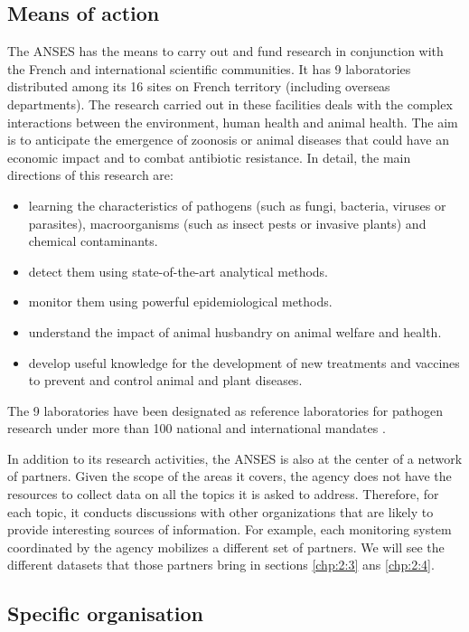 \subsection{Means of action}

The ANSES has the means to carry out and fund research in conjunction with the French and international scientific communities. It has 9 laboratories distributed among its 16 sites on French territory (including overseas departments). The research carried out in these facilities deals with the complex interactions between the environment, human health and animal health. The aim is to anticipate the emergence of zoonosis or animal diseases that could have an economic impact and to combat antibiotic resistance. In detail, the main directions of this research are:
\begin{itemize}
\item learning the characteristics of pathogens (such as fungi, bacteria, viruses or parasites), macroorganisms (such as insect pests or invasive plants) and chemical contaminants. 
\item detect them using state-of-the-art analytical methods.
\item monitor them using powerful epidemiological methods.
\item understand the impact of animal husbandry on animal welfare and health.
\item develop useful knowledge for the development of new treatments and vaccines to prevent and control animal and plant diseases. 
\end{itemize} 
The 9 laboratories have been designated as reference laboratories for pathogen research under more than 100 national and international mandates \cite{ANSESLABS}.

In addition to its research activities, the ANSES is also at the center of a network of partners. Given the scope of the areas it covers, the agency does not have the resources to collect data on all the topics it is asked to address. Therefore, for each topic, it conducts discussions with other organizations that are likely to provide interesting sources of information. For example, each monitoring system coordinated by the agency mobilizes a different set of partners. We will see the different datasets that those partners bring in sections \ref{chp:2:3} ans \ref{chp:2:4}. 

\subsection{Specific organisation}

